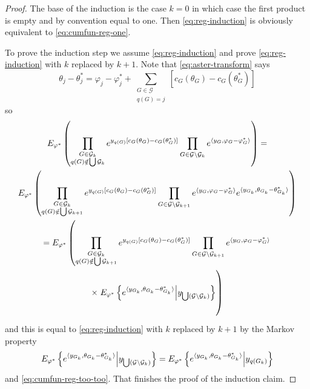 \begin{proof}
The base of the induction is the case $k = 0$ in which case the
first product is empty and by convention equal to one.
Then \eqref{eq:reg-induction} is obviously equivalent
to \eqref{eq:cumfun-reg-one}.

To prove the induction step we assume \eqref{eq:reg-induction}
and prove \eqref{eq:reg-induction} with $k$ replaced by $k + 1$.
Note that \eqref{eq:aster-transform} says
\begin{equation} \label{eq:reg-aster-transform}
   \theta_j - \theta_j^*
   =
   \varphi_j - \varphi_j^*
   +
   \sum_{\substack{G \in \mathcal{G} \\ q(G) = j}}
   [ c_G(\theta_G) - c_G(\theta_G^*) ]
\end{equation}
so
\begin{multline*}
   E_{\varphi^*}\left(
   \prod_{\substack{G \in \mathcal{G}_k \\ q(G) \notin \bigcup \mathcal{G}_k}}
   e^{y_{q(G)} [c_G(\theta_G) - c_G(\theta_G^*)]}
   \prod_{G \in \mathcal{G} \setminus \mathcal{G}_k}
   e^{\inner{y_G, \varphi_G - \varphi_G^*}}
   \right)
   =
   \\
   E_{\varphi^*}\left(
   \prod_{\substack{G \in \mathcal{G}_k \\
       q(G) \notin \bigcup \mathcal{G}_{k + 1}}}
   e^{y_{q(G)} [c_G(\theta_G) - c_G(\theta_G^*)]}
   \prod_{G \in \mathcal{G} \setminus \mathcal{G}_{k + 1}}
   e^{\inner{y_G, \varphi_G - \varphi_G^*}}
   e^{\inner{y_{G_k}, \theta_{G_k} - \theta_{G_k}^*}}
   \right)
   \\
   =
   E_{\varphi^*}\left(
   \prod_{\substack{G \in \mathcal{G}_k \\
       q(G) \notin \bigcup \mathcal{G}_{k + 1}}}
   e^{y_{q(G)} [c_G(\theta_G) - c_G(\theta_G^*)]}
   \prod_{G \in \mathcal{G} \setminus \mathcal{G}_{k + 1}}
   e^{\inner{y_G, \varphi_G - \varphi_G^*}}
   \right.
   \\
   \times
   \left.
   \vphantom{\prod_{\substack{G \in \mathcal{G}_{k + 1} \\
       q(G) \notin \bigcup \mathcal{G}_{k + 1}}}}
   E_{\varphi^*}\left\{
   e^{\inner{y_{G_k}, \theta_{G_k} - \theta_{G_k}^*}}
   \middle| y_{\bigcup (\mathcal{G} \setminus \mathcal{G}_k)}
   \right\}
   \right)
\end{multline*}
and this is equal to \eqref{eq:reg-induction} with $k$ replaced by $k + 1$
by the Markov property
$$
   E_{\varphi^*}\left\{
   e^{\langle y_{G_k}, \theta_{G_k} - \theta_{G_k}^* \rangle}
   \middle| y_{\bigcup (\mathcal{G} \setminus \mathcal{G}_k)}
   \right\}
   =
   E_{\varphi^*}\left\{
   e^{\langle y_{G_k}, \theta_{G_k} - \theta_{G_k}^* \rangle}
   \middle| y_{q(G_k)}
   \right\}
$$
and \eqref{eq:cumfun-reg-too-too}.
That finishes the proof of the induction claim.


\end{proof}
